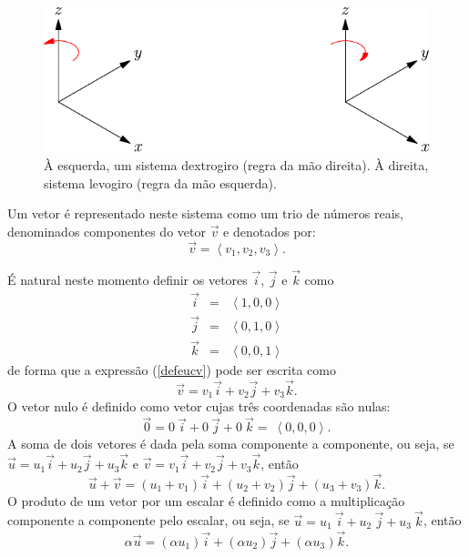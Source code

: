 \begin{figure}\begin{center}
 \includegraphics{./cap_algvet/figs/eixos_levo_destro}
      \caption{À esquerda, um sistema dextrogiro (regra da mão direita). À direita, sistema levogiro (regra da mão esquerda).}
      \label{fig:marginfig}
  \end{center}
  \end{figure}
 
 Um vetor é representado neste sistema como um trio de números reais, denominados componentes do vetor $\vec{v}$ e denotados por: 
\begin{equation}\label{defeucv}\vec{v}=\left<v_1,v_2,v_3\right>.\end{equation}
  
É natural neste momento definir os vetores $\vec{i}$, $\vec{j}$ e $\vec{k}$ como
\begin{equation}\label{defijk}
\begin{array}{rcl}
\vec{i}&=&\left<1,0,0\right>\\
\vec{j}&=&\left<0,1,0\right>\\
\vec{k}&=&\left<0,0,1\right>
\end{array}
\end{equation}
de forma que a expressão (\ref{defeucv}) pode ser escrita como
\begin{equation}\label{repijk}\vec{v}=v_1  \vec{i}+v_2  \vec{j}+v_3 \vec{k}.\end{equation}
O vetor nulo é definido como vetor cujas três coordenadas são nulas:
\begin{equation}\label{defnulo}\vec{0}=0 ~\! \vec{i}+0~\!  \vec{j}+0~\!  \vec{k}= ~\!\left<0,0,0\right>.\end{equation}
A soma de dois vetores é dada pela soma componente a componente, ou seja, se $\vec{u}=u_1  \vec{i}+u_2\vec{j}+u_3 \vec{k}$ e $\vec{v}=v_1\vec{i}+v_2\vec{j}+v_3 \vec{k}$, então
\begin{equation}\label{defsoma}\vec{u}+\vec{v}= \left(u_1+v_1\right) \vec{i}+\left(u_2+v_2\right) \vec{j}+\left(u_3+v_3\right) \vec{k}.\end{equation}
O produto de um vetor por um escalar é definido como a multiplicação componente a componente pelo escalar, ou seja, se $\vec{u}=u_1~\!  \vec{i}+u_2~\!  \vec{j}+u_3 ~\! \vec{k}$, então
\begin{equation}\label{defprod}\alpha\vec{u}=(\alpha u_1)\vec{i}+(\alpha u_2)\vec{j}+(\alpha u_3) \vec{k} .\end{equation}

